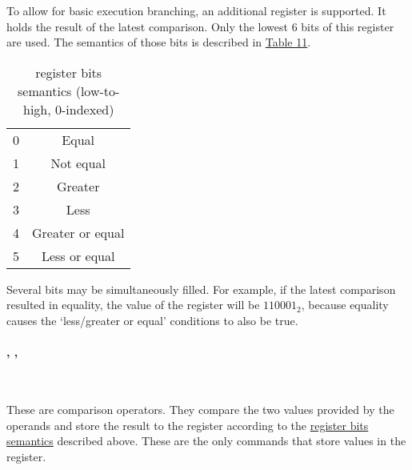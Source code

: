 To allow for basic execution branching, an additional  register
is supported.
It holds the result of the latest comparison.
Only the lowest 6 bits of this register are used.
The semantics of those bits is described in \hyperlink{flags:bits}{Table 11}.

\hypertarget{flags:bits}{}
{
    \vspace{-0.4cm}
    \renewcommand{\arraystretch}{1.4}
    \begin{table}[h!]
        \centering
        \caption{ register bits semantics (low-to-high, 0-indexed)}
        \vspace{2mm}
        \begin{tabular}{| c | c |}
            \hline
            0 & Equal            \\
            1 & Not equal        \\
            2 & Greater          \\
            3 & Less             \\
            4 & Greater or equal \\
            5 & Less or equal    \\
            \hline
        \end{tabular}
    \end{table}
}

Several bits may be simultaneously filled.
For example, if the latest comparison resulted in equality,
the value of the  register will be $110001_2$, because equality
causes the `less/greater or equal' conditions to also be true.

\vspace{-0.35cm}

\paragraph{, , }\

These are comparison operators.
They compare the two values provided by the operands and store the result to
the  register according to the \hyperlink{flags:bits}{
register bits semantics} described above.
These are the only commands that store values in the  register.

